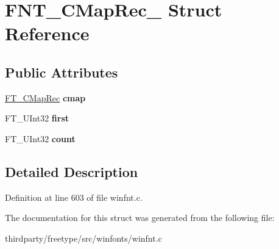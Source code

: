 \hypertarget{struct_f_n_t___c_map_rec__}{}\section{F\+N\+T\+\_\+\+C\+Map\+Rec\+\_\+ Struct Reference}
\label{struct_f_n_t___c_map_rec__}
\subsection*{Public Attributes}
\begin{DoxyCompactItemize}
\item 
\mbox{\label{struct_f_n_t___c_map_rec___a54c263f27a8b2a387d828231c2ea2462}} 
\hyperlink{struct_f_t___c_map_rec__}{F\+T\+\_\+\+C\+Map\+Rec} {\bfseries cmap}
\item 
\mbox{\label{struct_f_n_t___c_map_rec___a83bb61b113ab39676738bc1bdf5ae399}} 
F\+T\+\_\+\+U\+Int32 {\bfseries first}
\item 
\mbox{\label{struct_f_n_t___c_map_rec___a6154a287f1b85a0dcb01efe2131db7fd}} 
F\+T\+\_\+\+U\+Int32 {\bfseries count}
\end{DoxyCompactItemize}


\subsection{Detailed Description}


Definition at line 603 of file winfnt.\+c.



The documentation for this struct was generated from the following file\+:\begin{DoxyCompactItemize}
\item 
thirdparty/freetype/src/winfonts/winfnt.\+c\end{DoxyCompactItemize}
